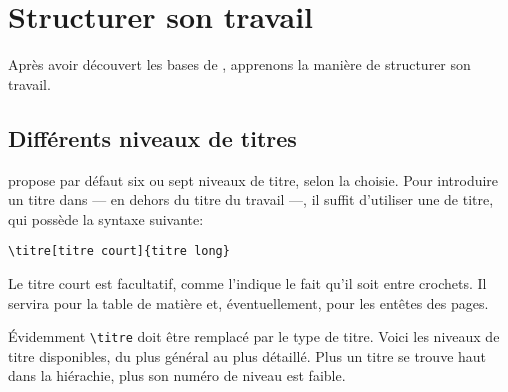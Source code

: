 \chapter{Structurer son travail}
\begin{prealable}
Après avoir découvert les bases de \logiciel{\LaTeX}, apprenons la manière de structurer son travail.
\end{prealable}

\section{Différents niveaux de titres}\label{niveautitre}

\logiciel{\LaTex} propose par défaut six ou sept niveaux de titre, selon la  choisie.
Pour introduire un titre dans \logiciel{\LaTex} --- en dehors du titre du travail ---, il suffit d'utiliser une  de titre, qui possède la syntaxe suivante:
\begin{verbatim}
\titre[titre court]{titre long}
\end{verbatim}

Le titre court est facultatif, comme l'indique le fait qu'il soit entre crochets. Il servira pour la table de matière et, éventuellement, pour les entêtes des pages.

Évidemment \verb|\titre| doit être remplacé par le type de titre. Voici les niveaux de titre disponibles, du plus général au plus détaillé. Plus un titre se trouve haut dans la hiérachie, plus son numéro de niveau est faible.

